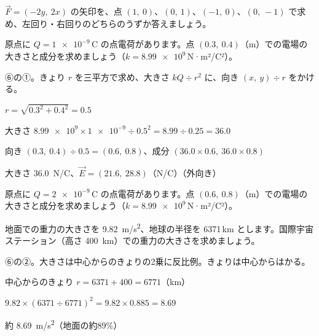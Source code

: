 \begin{jibun}
$\vec F=(-2y,\ 2x)$ の矢印を、点 $(1,\ 0)$、$(0,\ 1)$、$(-1,\ 0)$、$(0,\ -1)$ で求め、左回り・右回りのどちらのうずか答えましょう。
\end{jibun}

\begin{reidai}[点電荷の電場]
原点に $Q=\num{1e-9}$\,C の点電荷があります。点 $(0.3,\ 0.4)$（m）での電場の大きさと成分を求めましょう（$k=\num{8.99e9}$\,N·m²/C²）。\par
\kangaekata ⑥の①。きょり $r$ を三平方で求め、大きさ $kQ\div r^2$ に、向き $(x,\ y)\div r$ をかける。\par
\shiki\kviiifs{}\zw{} $r=\sqrt{0.3^2+0.4^2}=0.5$\par
\kviiifa 大きさ $\num{8.99e9}\times\num{1e-9}\div0.5^2=8.99\div0.25=36.0$\par
\kviiifa 向き $(0.3,\ 0.4)\div0.5=(0.6,\ 0.8)$、成分 $(36.0\times0.6,\ 36.0\times0.8)$\par
\kotae\kviiifs{}\zw{} 大きさ \qty{36.0}{N/C}、$\vec E=(21.6,\ 28.8)$（N/C）（外向き）
\end{reidai}

\begin{jibun}
原点に $Q=\num{2e-9}$\,C の点電荷があります。点 $(0.6,\ 0.8)$（m）での電場の大きさと成分を求めましょう（$k=\num{8.99e9}$\,N·m²/C²）。
\end{jibun}

\begin{reidai}[高い所の重力]
地面での重力の大きさを \qty{9.82}{m/s^2}、地球の半径を \num{6371}\,km とします。国際宇宙ステーション（高さ \qty{400}{km}）での重力の大きさを求めましょう。\par
\kangaekata ⑥の②。大きさは中心からのきょりの2乗に反比例。きょりは中心からはかる。\par
\shiki\kviiifs{}\zw{} 中心からのきょり $r=\num{6371}+400=\num{6771}$（km）\par
\kviiifa $9.82\times(6371\div6771)^2=9.82\times0.885=8.69$\par
\kotae\kviiifs{}\zw{} 約 \qty{8.69}{m/s^2}（地面の約89\%）
\end{reidai}

